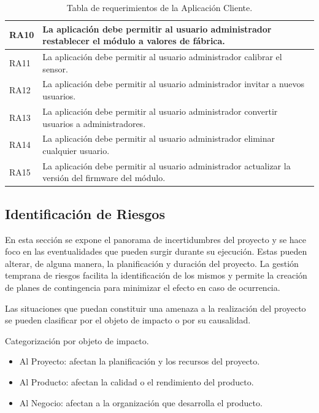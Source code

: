 \begin{table}[ht]
\begin{tabular}{|l|m{12cm}|}
		RA10                              & La aplicación debe permitir al usuario administrador restablecer el módulo a valores de fábrica.          \\ \hline
		RA11                              & La aplicación debe permitir al usuario administrador calibrar el sensor.                                  \\ \hline
		RA12                              & La aplicación debe permitir al usuario administrador invitar a nuevos usuarios.                           \\ \hline
		RA13                              & La aplicación debe permitir al usuario administrador convertir usuarios a administradores.                \\ \hline
		RA14                              & La aplicación debe permitir al usuario administrador eliminar cualquier usuario.                          \\ \hline
		RA15                              & La aplicación debe permitir al usuario administrador actualizar la versión del firmware del módulo.       \\ \hline
	\end{tabular}
	\caption[Requerimientos de la Aplicación]{Tabla de requerimientos de la Aplicación Cliente.}
	\label{table:req_aplicacion}
\end{table}



\subsection{Identificación de Riesgos}

En esta sección se expone el panorama de incertidumbres del proyecto y se hace foco en las eventualidades que pueden surgir durante su ejecución. Estas pueden alterar, de alguna manera, la planificación y duración del proyecto.
La gestión temprana de riesgos facilita la identificación de los mismos y permite la creación de planes de contingencia para minimizar el efecto en caso de ocurrencia.

Las situaciones que puedan constituir una amenaza a la realización del proyecto se pueden clasificar por el objeto de impacto o por su causalidad.

Categorización por objeto de impacto.
\begin{itemize}
	\item Al Proyecto: afectan la planificación y los recursos del proyecto.
	\item Al Producto: afectan la calidad o el rendimiento del producto.
	\item Al Negocio: afectan a la organización que desarrolla el producto.
\end{itemize}


